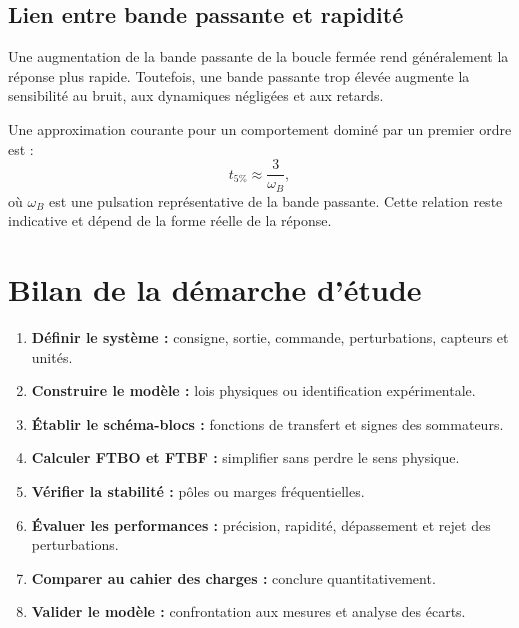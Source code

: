 \subsection{Lien entre bande passante et rapidité}

Une augmentation de la bande passante de la boucle fermée rend généralement la réponse plus rapide. Toutefois, une bande passante trop élevée augmente la sensibilité au bruit, aux dynamiques négligées et aux retards.

Une approximation courante pour un comportement dominé par un premier ordre est :
\[
t_{5\%}\approx\frac{3}{\omega_B},
\]
où $\omega_B$ est une pulsation représentative de la bande passante. Cette relation reste indicative et dépend de la forme réelle de la réponse.

\section{Bilan de la démarche d'étude}\label{sec:sa-demarche}

\begin{SAmethode}[title={Étudier un système asservi}]
\begin{enumerate}
  \item \textbf{Définir le système :} consigne, sortie, commande, perturbations, capteurs et unités.
  \item \textbf{Construire le modèle :} lois physiques ou identification expérimentale.
  \item \textbf{Établir le schéma-blocs :} fonctions de transfert et signes des sommateurs.
  \item \textbf{Calculer FTBO et FTBF :} simplifier sans perdre le sens physique.
  \item \textbf{Vérifier la stabilité :} pôles ou marges fréquentielles.
  \item \textbf{Évaluer les performances :} précision, rapidité, dépassement et rejet des perturbations.
  \item \textbf{Comparer au cahier des charges :} conclure quantitativement.
  \item \textbf{Valider le modèle :} confrontation aux mesures et analyse des écarts.
\end{enumerate}
\end{SAmethode}

